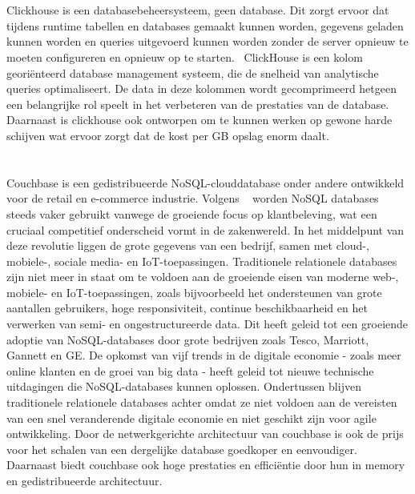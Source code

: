 \section{}%
\label{sec:ClickHouse}

Clickhouse is een databasebeheersysteem, geen database. Dit zorgt ervoor dat tijdens runtime tabellen en databases gemaakt kunnen worden, gegevens geladen kunnen worden en queries uitgevoerd kunnen worden zonder de server opnieuw te moeten configureren en opnieuw op te starten.~\autocite{ClickHouse} ClickHouse is een kolom georiënteerd database management systeem, die de snelheid van analytische queries optimaliseert. De data in deze kolommen wordt gecomprimeerd hetgeen een belangrijke rol speelt in het verbeteren van de prestaties van de database. Daarnaast is clickhouse ook ontworpen om te kunnen werken op gewone harde schijven wat ervoor zorgt dat de kost per GB opslag enorm daalt.

\section{}%
\label{sec:Couchbase}

Couchbase is een gedistribueerde NoSQL-clouddatabase onder andere ontwikkeld voor de retail en e-commerce industrie. Volgens ~\textcite{Couchbase} worden NoSQL databases steeds vaker gebruikt vanwege de groeiende focus op klantbeleving, wat een cruciaal competitief onderscheid vormt in de zakenwereld. In het middelpunt van deze revolutie liggen de grote gegevens van een bedrijf, samen met cloud-, mobiele-, sociale media- en IoT-toepassingen. Traditionele relationele databases zijn niet meer in staat om te voldoen aan de groeiende eisen van moderne web-, mobiele- en IoT-toepassingen, zoals bijvoorbeeld het ondersteunen van grote aantallen gebruikers, hoge responsiviteit, continue beschikbaarheid en het verwerken van semi- en ongestructureerde data. Dit heeft geleid tot een groeiende adoptie van NoSQL-databases door grote bedrijven zoals Tesco, Marriott, Gannett en GE. De opkomst van vijf trends in de digitale economie - zoals meer online klanten en de groei van big data - heeft geleid tot nieuwe technische uitdagingen die NoSQL-databases kunnen oplossen. Ondertussen blijven traditionele relationele databases achter omdat ze niet voldoen aan de vereisten van een snel veranderende digitale economie en niet geschikt zijn voor agile ontwikkeling. Door de netwerkgerichte architectuur van couchbase is ook de prijs voor het schalen van een dergelijke database goedkoper en eenvoudiger. Daarnaast biedt couchbase ook hoge prestaties en efficiëntie door hun in memory en gedistribueerde architectuur.~\autocite{Couchbasea}

